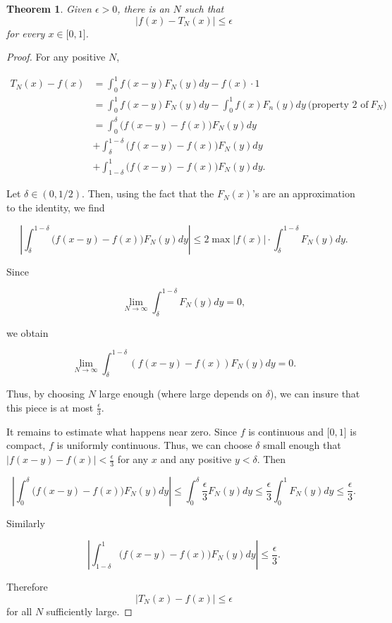 \documentclass[12pt,letterpaper]{report}
\newcommand\be{\begin{equation}}
\newcommand\ee{\end{equation}}
\newtheorem{thm}{Theorem}[section]
\begin{document}
\begin{thm}\label{thmfejer} Given $\epsilon>0$, there is an $N$ such that
\be |f(x) - T_N(x) |\leq \epsilon\ee  for every $x\in \lbrack
0,1\rbrack$.
\end{thm}
\begin{proof}
For any positive $N$,

\be \begin{aligned} T_N(x) - f(x) &= \int_0^1 f(x-y) F_N(y) d y -
f(x)\cdot 1\\
              &= \int_0^1 f(x-y) F_N(y) d y - \int_0^1 f(x) F_n(y) d y \ \mbox{(property 2 of} \ F_N)\\
              &= \int_0^\delta \Big(f(x-y) - f(x)\Big) F_N(y) d y \\ &+
\int_\delta^{1-\delta} \Big(f(x-y) - f(x)\Big) F_N(y) d y  \\ &+
\int_{1-\delta}^1 \Big(f(x-y) - f(x)\Big) F_N(y) d y .
\end{aligned} \ee

Let $\delta\in (0,1/2)$. Then, using the fact that the $F_N(x)$'s
are an approximation to the identity, we find

\be \left| \int_\delta^{1-\delta} \Big(f(x-y) - f(x)\Big) F_N(y) d
y \right| \leq
 2 \max |f(x)| \cdot \int_\delta^{1-\delta} F_N(y) d y .\ee

Since

\be \lim_{N\to \infty} \int_\delta^{1-\delta} F_N(y) d y = 0, \ee

we obtain

\be \lim_{N\to \infty} \int_\delta^{1-\delta} (f(x-y) - f(x))
F_N(y) d y  = 0 .\ee

Thus, by choosing $N$ large enough (where large depends on
$\delta$), we can insure that this piece is at most
$\frac{\epsilon}{3}$.

It remains to estimate what happens near zero. Since $f$ is
continuous and $\lbrack 0,1\rbrack$ is compact, $f$ is uniformly
continuous. Thus, we can choose $\delta$ small enough that
$|f(x-y)-f(x)|< \frac{\epsilon}{3}$ for any $x$ and any positive
$y<\delta$. Then

\be \left|\int_0^\delta \Big(f(x-y) - f(x)\Big) F_N(y) d y \right|
\leq \int_0^\delta \frac{\epsilon}{3} F_N(y) d y \leq
\frac{\epsilon}{3} \int_0^1 F_N(y) d y \leq \frac{\epsilon}{3}.\ee

Similarly

\be \left|\int_{1-\delta}^1 \Big(f(x-y) - f(x)\Big) F_N(y) d y
\right| \leq \frac{\epsilon}{3} .\ee

Therefore \be |T_N(x) - f(x)|\leq \epsilon \ee for all $N$
sufficiently large.
\end{proof}
\end{document}
